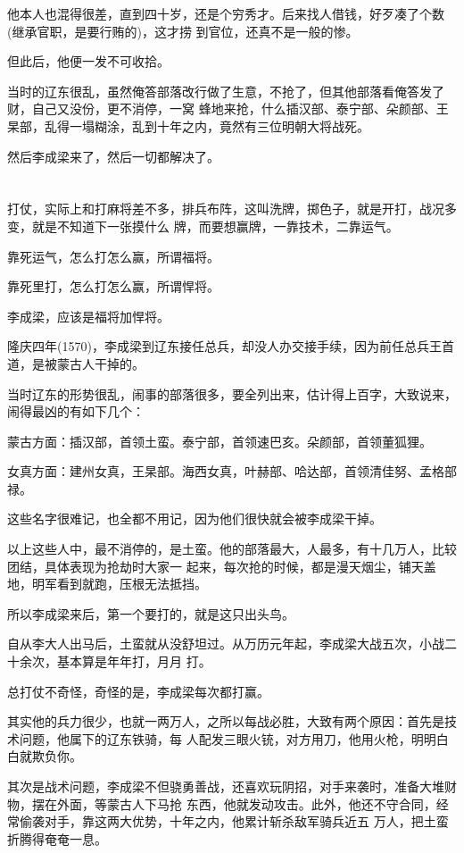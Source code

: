 \documentclass[11pt,a4paper,onecolumn]{article}
\begin{document}
他本人也混得很差，直到四十岁，还是个穷秀才。后来找人借钱，好歹凑了个数(继承官职，是要行贿的)，这才捞
到官位，还真不是一般的惨。

但此后，他便一发不可收拾。

当时的辽东很乱，虽然俺答部落改行做了生意，不抢了，但其他部落看俺答发了财，自己又没份，更不消停，一窝
蜂地来抢，什么插汉部、泰宁部、朵颜部、王杲部，乱得一塌糊涂，乱到十年之内，竟然有三位明朝大将战死。

然后李成梁来了，然后一切都解决了。

\section[\thesection]{}

打仗，实际上和打麻将差不多，排兵布阵，这叫洗牌，掷色子，就是开打，战况多变，就是不知道下一张摸什么
牌，而要想赢牌，一靠技术，二靠运气。

靠死运气，怎么打怎么赢，所谓福将。

靠死里打，怎么打怎么赢，所谓悍将。

李成梁，应该是福将加悍将。

隆庆四年(1570)，李成梁到辽东接任总兵，却没人办交接手续，因为前任总兵王首道，是被蒙古人干掉的。

当时辽东的形势很乱，闹事的部落很多，要全列出来，估计得上百字，大致说来，闹得最凶的有如下几个：

蒙古方面：插汉部，首领土蛮。泰宁部，首领速巴亥。朵颜部，首领董狐狸。

女真方面：建州女真，王杲部。海西女真，叶赫部、哈达部，首领清佳努、孟格部禄。

这些名字很难记，也全都不用记，因为他们很快就会被李成梁干掉。

以上这些人中，最不消停的，是土蛮。他的部落最大，人最多，有十几万人，比较团结，具体表现为抢劫时大家一
起来，每次抢的时候，都是漫天烟尘，铺天盖地，明军看到就跑，压根无法抵挡。

所以李成梁来后，第一个要打的，就是这只出头鸟。

自从李大人出马后，土蛮就从没舒坦过。从万历元年起，李成梁大战五次，小战二十余次，基本算是年年打，月月
打。

总打仗不奇怪，奇怪的是，李成梁每次都打赢。

其实他的兵力很少，也就一两万人，之所以每战必胜，大致有两个原因：首先是技术问题，他属下的辽东铁骑，每
人配发三眼火铳，对方用刀，他用火枪，明明白白就欺负你。

其次是战术问题，李成梁不但骁勇善战，还喜欢玩阴招，对手来袭时，准备大堆财物，摆在外面，等蒙古人下马抢
东西，他就发动攻击。此外，他还不守合同，经常偷袭对手，靠这两大优势，十年之内，他累计斩杀敌军骑兵近五
万人，把土蛮折腾得奄奄一息。
\end{document}
